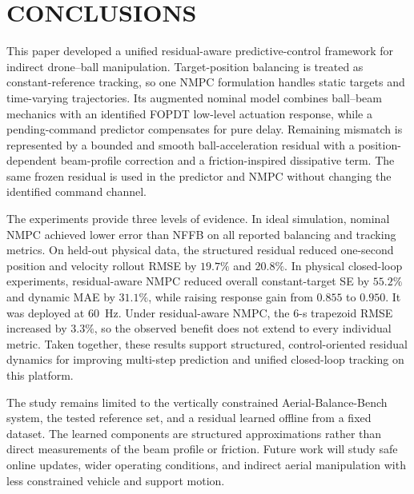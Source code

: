 \documentclass[letterpaper, 10 pt, conference]{ieeeconf}  %
\begin{document}
\section{CONCLUSIONS}
\label{sec:conclusions}
This paper developed a unified residual-aware predictive-control framework for indirect drone--ball
manipulation. Target-position balancing is treated as constant-reference tracking, so one NMPC formulation
handles static targets and time-varying trajectories. Its augmented nominal model combines ball--beam mechanics
with an identified FOPDT low-level actuation response, while a pending-command predictor compensates for pure
delay. Remaining mismatch is represented by a bounded and smooth ball-acceleration residual with a
position-dependent beam-profile correction and a friction-inspired dissipative term. The same frozen residual is
used in the predictor and NMPC without changing the identified command channel.

The experiments provide three levels of evidence. In ideal simulation, nominal NMPC achieved lower error than
NFFB on all reported balancing and tracking metrics. On held-out physical data, the structured residual reduced
one-second position and velocity rollout RMSE by $19.7\%$ and $20.8\%$. In physical closed-loop experiments,
residual-aware NMPC reduced overall constant-target SE by $55.2\%$ and dynamic MAE by $31.1\%$, while raising
response gain from $0.855$ to $0.950$. It was deployed at 60~Hz. Under residual-aware NMPC, the 6-s trapezoid
RMSE increased by $3.3\%$, so the observed benefit does not extend to every individual metric. Taken together,
these results support
structured, control-oriented residual dynamics for improving multi-step prediction and unified closed-loop
tracking on this platform.

The study remains limited to the vertically constrained Aerial-Balance-Bench system, the tested reference set,
and a residual learned offline from a fixed dataset. The learned components are structured approximations rather
than direct measurements of the beam profile or friction. Future work will study safe online updates, wider
operating conditions, and indirect aerial manipulation with less constrained vehicle and support motion.









\end{document}
